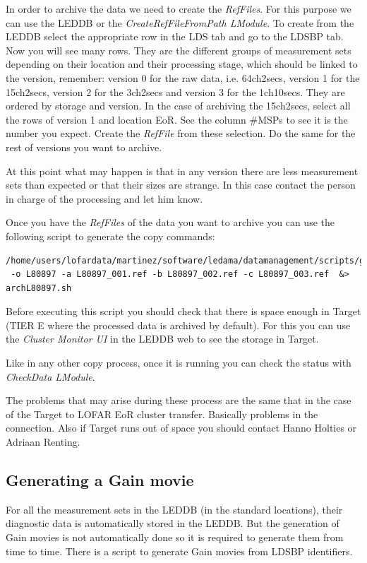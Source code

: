 \documentclass[a4paper,11pt]{article}
\begin{document}
In order to archive the data we need to create the \textit{RefFiles}. For this purpose we can use the LEDDB or the \textit{CreateRefFileFromPath LModule}. To create from the LEDDB select the appropriate row in the LDS tab and go to the LDSBP tab. Now you will see many rows. They are the different groups of measurement sets depending on their location and their processing stage, which should be linked to the version, remember: version 0 for the raw data, i.e. 64ch2secs, version 1 for the 15ch2secs, version 2 for the 3ch2secs and version 3 for the 1ch10secs. They are ordered by storage and version. In the case of archiving the 15ch2secs, select all the rows of version 1 and location EoR. See the column \#MSPs to see it is the number you expect. Create the \textit{RefFile} from these selection. Do the same for the rest of versions you want to archive.

At this point what may happen is that in any version there are less measurement sets than expected or that their sizes are strange. In this case contact the person in charge of the processing and let him know.

Once you have the \textit{RefFiles} of the data you want to archive you can use the following script to generate the copy commands:
\begin{verbatim}
/home/users/lofardata/martinez/software/ledama/datamanagement/scripts/gencopyeor2target.py
 -o L80897 -a L80897_001.ref -b L80897_002.ref -c L80897_003.ref  &> archL80897.sh
\end{verbatim}

Before executing this script you should check that there is space enough in Target (TIER E where the processed data is archived by default). For this you can use the \textit{Cluster Monitor UI} in the LEDDB web to see the storage in Target.

Like in any other copy process, once it is running you can check the status with \textit{CheckData LModule}.

The problems that may arise during these process are the same that in the case of the Target to LOFAR EoR cluster transfer. Basically problems in the connection. Also if Target runs out of space you should contact Hanno Holties or Adriaan Renting.

\subsection{Generating a Gain movie}

For all the measurement sets in the LEDDB (in the standard locations), their diagnostic data is automatically stored in the LEDDB. But the generation of Gain movies is not automatically done so it is required to generate them from time to time. There is a script to generate Gain movies from LDSBP identifiers.
\end{document}
